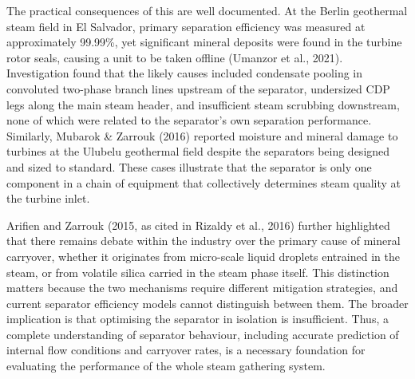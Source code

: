 The practical consequences of this are well documented. At the Berlin geothermal steam field in El Salvador, primary separation efficiency was measured at approximately 99.99\%, yet significant mineral deposits were found in the turbine rotor seals, causing a unit to be taken offline (Umanzor et al., 2021). Investigation found that the likely causes included condensate pooling in convoluted two-phase branch lines upstream of the separator, undersized CDP legs along the main steam header, and insufficient steam scrubbing downstream, none of which were related to the separator's own separation performance. Similarly, Mubarok \& Zarrouk (2016) reported moisture and mineral damage to turbines at the Ulubelu geothermal field despite the separators being designed and sized to standard. These cases illustrate that the separator is only one component in a chain of equipment that collectively determines steam quality at the turbine inlet.

Arifien and Zarrouk (2015, as cited in Rizaldy et al., 2016) further highlighted that there remains debate within the industry over the primary cause of mineral carryover, whether it originates from micro-scale liquid droplets entrained in the steam, or from volatile silica carried in the steam phase itself. This distinction matters because the two mechanisms require different mitigation strategies, and current separator efficiency models cannot distinguish between them. The broader implication is that optimising the separator in isolation is insufficient. Thus, a complete understanding of separator behaviour, including accurate prediction of internal flow conditions and carryover rates, is a necessary foundation for evaluating the performance of the whole steam gathering system.
